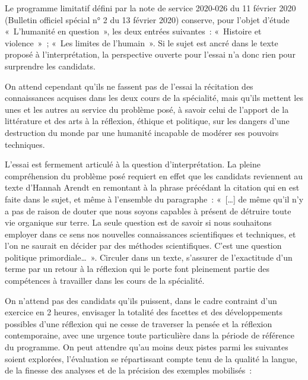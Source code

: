 {Le programme limitatif défini par la note de service 2020-026 du 11 février 2020
(Bulletin officiel spécial n° 2 du 13 février 2020) conserve, pour l'objet d'étude
«~L'humanité en question~», les deux entrées suivantes~: «~Histoire et violence~»~; «~Les
limites de l'humain~». Si le sujet est ancré dans le texte proposé à l'interprétation, la
perspective ouverte pour l'essai n'a donc rien pour surprendre les candidats.

On attend cependant qu'ils ne fassent pas de l'essai la récitation des connaissances
acquises dans les deux cours de la spécialité, mais qu'ils mettent les unes et les autres
au service du problème posé, à savoir celui de l'apport de la littérature et des arts à
la réflexion, éthique et politique, sur les dangers d'une destruction du monde par une
humanité incapable de modérer ses pouvoirs techniques.

L'essai est fermement articulé à la question d'interprétation. La pleine compréhension
du problème posé requiert en effet que les candidats reviennent au texte d'Hannah
Arendt en remontant à la phrase précédant la citation qui en est faite dans le sujet, et
même à l'ensemble du paragraphe~: «~[…] de même qu'il n'y a pas de raison de douter
que nous soyons capables à présent de détruire toute vie organique sur terre. La
seule question est de savoir si nous souhaitons employer dans ce sens nos nouvelles
connaissances scientifiques et techniques, et l'on ne saurait en décider par des
méthodes scientifiques. C'est une question politique primordiale…~». Circuler dans un
texte, s'assurer de l'exactitude d'un terme par un retour à la réflexion qui le porte font
pleinement partie des compétences à travailler dans les cours de la spécialité.

On n'attend pas des candidats qu'ils puissent, dans le cadre contraint d'un exercice
en 2 heures, envisager la totalité des facettes et des développements possibles d'une
réflexion qui ne cesse de traverser la pensée et la réflexion contemporaine, avec une
urgence toute particulière dans la période de référence du programme. On peut
attendre qu'au moins deux pistes parmi les suivantes soient explorées, l'évaluation se
répartissant compte tenu de la qualité la langue, de la finesse des analyses et de la
précision des exemples mobilisés~:

}
